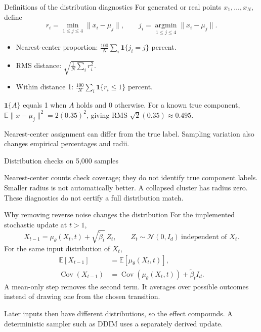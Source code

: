 \documentclass[aspectratio=169,11pt]{beamer}
\begin{document}
\begin{frame}{Definitions of the distribution diagnostics}
For generated or real points $x_1,\ldots,x_N$, define
\[r_i=\min_{1\leq j\leq4}\|x_i-\mu_j\|,
\qquad j_i=\operatorname*{argmin}_{1\leq j\leq4}\|x_i-\mu_j\|.\]
\begin{itemize}\setlength\itemsep{3mm}
\item Nearest-center proportion: $\frac{100}{N}\sum_i\mathbf1\{j_i=j\}$ percent.
\item RMS distance: $\sqrt{\frac1N\sum_i r_i^2}$.
\item Within distance 1: $\frac{100}{N}\sum_i\mathbf1\{r_i\leq1\}$ percent.
\end{itemize}
\par\vspace{3mm}
$\mathbf1\{A\}$ equals 1 when $A$ holds and 0 otherwise. For a known true component, $\mathbb E\|x-\mu_j\|^2=2(0.35)^2$, giving RMS $\sqrt2(0.35)\approx0.495$.
\par\vspace{2mm}
\small Nearest-center assignment can differ from the true label. Sampling variation also changes empirical percentages and radii.
\end{frame}

\begin{frame}{Distribution checks on 5,000 samples}
\begin{center}
\small
\end{center}
\par\vspace{3mm}
Nearest-center counts check coverage; they do not identify true component labels.\\[3mm]
Smaller radius is not automatically better. A collapsed cluster has radius zero.\\[2mm]
\small These diagnostics do not certify a full distribution match.
\end{frame}

\begin{frame}{Why removing reverse noise changes the distribution}
For the implemented stochastic update at $t>1$,
\[X_{t-1}=\mu_\theta(X_t,t)+\sqrt{\tilde\beta_t}\,Z_t,
\qquad Z_t\sim\mathcal N(0,I_d)\ \text{independent of }X_t.\]
For the same input distribution of $X_t$,
\begin{align*}
\mathbb E[X_{t-1}]&=\mathbb E[\mu_\theta(X_t,t)],\\[2mm]
\operatorname{Cov}(X_{t-1})
&=\operatorname{Cov}(\mu_\theta(X_t,t))+\tilde\beta_t I_d.
\end{align*}
A mean-only step removes the second term. It averages over possible outcomes instead of drawing one from the chosen transition.
\par\vspace{3mm}
Later inputs then have different distributions, so the effect compounds. A deterministic sampler such as DDIM uses a separately derived update.
\end{frame}
\end{document}
